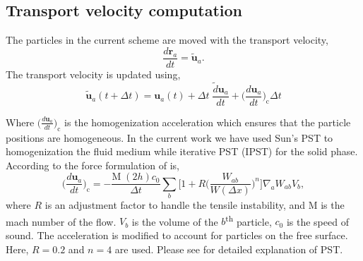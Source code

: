 \documentclass[10pt, conference]{FMFP2022}
\newcommand{\ten}[1]{\ensuremath{\mathbf{#1}}}
\begin{document}
\subsection{\textbf{Transport velocity computation}}\label{subsec:transport-velocity}
The particles in the current scheme are moved with the transport velocity,
\begin{equation}
  \label{eq:transport_velocity_position_derivative}
  \frac{d\ten{r}_a}{dt} = \ten{\tilde{u}}_a.
\end{equation}
%
The transport velocity is updated using,
\begin{equation}
  \label{eq:transport_velocity}
  \ten{\tilde{u}}_a(t + \Delta t) =\ten{u}_a(t) + \Delta t \; \frac{\tilde{d} \ten{u}_a}{dt} +
  \bigg(\frac{d \ten{u}_{a}}{dt}\bigg)_{\text{c}} \Delta t
\end{equation}

Where $\big(\frac{d \ten{u}_a}{dt}\big)_{\text{c}}$ is the homogenization
acceleration which ensures that the particle positions are homogeneous. In the
current work we have used Sun's \cite{sun_consistent_2019} PST to homogenization
the fluid medium while iterative PST (IPST)\cite{huang_kernel_2019} for the
solid phase. According to \cite{adepu2021corrected} the force formulation of
\cite{sun_consistent_2019} is,
\begin{equation}
  \label{eq:sun2019_pst}
  \bigg(\frac{d \ten{u}_a}{dt}\bigg)_{\text{c}} = - \frac{\text{M} \;
    (2h) c_0}{\Delta t} \sum_b \bigg[1 + R \bigg( \frac{W_{ab}}{W(\Delta x)} \bigg)^n
  \bigg] \nabla_a W_{ab} V_b,
\end{equation}
where $R$ is an adjustment factor to handle the tensile instability, and
$\text{M}$ is the mach number of the flow. $V_b$ is the volume of the
$b$\textsuperscript{th} particle, $c_0$ is the speed of sound. The acceleration is modified to account for
particles on the free surface. Here, $R = 0.2$ and $n = 4$ are used. Please see
\cite{adepu2021corrected} for detailed explanation of PST.
\end{document}
